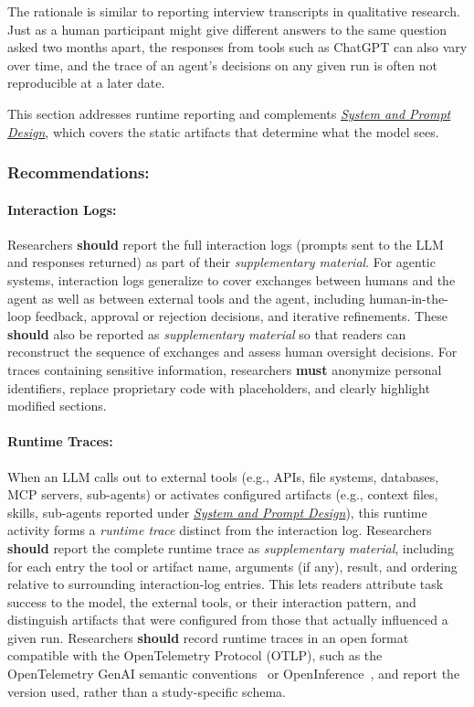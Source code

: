 \documentclass[smallextended]{svjour3}
\newcommand{\must}{\textbf{must}\xspace}
\newcommand{\should}{\textbf{should}\xspace}
\newcommand{\supplementarymaterial}{\emph{supplementary material}\xspace}
\newcommand{\supplementarymaterial}{\emph{supplementary material}\xspace}
\newcommand{\design}{\hyperref[sec:report-system-and-prompt-design]{\emph{System and Prompt Design}}\xspace}
\newcommand{\design}{\href{/guidelines\#report-system-and-prompt-design}{\emph{System and Prompt Design}}\xspace}
\newcommand{\guidelinesubsubsection}[1]{\subsubsection{\bfseries #1:}}
\newcommand{\guidelinesubsubsection}[1]{\subsubsection{#1}}
\begin{document}
The rationale is similar to reporting interview transcripts in qualitative research.
Just as a human participant might give different answers to the same question asked two months apart, the responses from tools such as ChatGPT can also vary over time, and the trace of an agent's decisions on any given run is often not reproducible at a later date.

This section addresses runtime reporting and complements \design, which covers the static artifacts that determine what the model sees.

\guidelinesubsubsection{Recommendations}

\paragraph{Interaction Logs:}
Researchers \should report the full interaction logs (prompts sent to the LLM and responses returned) as part of their \supplementarymaterial.
For agentic systems, interaction logs generalize to cover exchanges between humans and the agent as well as between external tools and the agent, including human-in-the-loop feedback, approval or rejection decisions, and iterative refinements.
These \should also be reported as \supplementarymaterial so that readers can reconstruct the sequence of exchanges and assess human oversight decisions.
For traces containing sensitive information, researchers \must anonymize personal identifiers, replace proprietary code with placeholders, and clearly highlight modified sections.

\paragraph{Runtime Traces:}
When an LLM calls out to external tools (e.g., APIs, file systems, databases, MCP servers, sub-agents) or activates configured artifacts (e.g., context files, skills, sub-agents reported under \design), this runtime activity forms a \emph{runtime trace} distinct from the interaction log.
Researchers \should report the complete runtime trace as \supplementarymaterial, including for each entry the tool or artifact name, arguments (if any), result, and ordering relative to surrounding interaction-log entries.
This lets readers attribute task success to the model, the external tools, or their interaction pattern, and distinguish artifacts that were configured from those that actually influenced a given run.
Researchers \should record runtime traces in an open format compatible with the OpenTelemetry Protocol (OTLP), such as the OpenTelemetry GenAI semantic conventions~\cite{otel_genai_semconv} or OpenInference~\cite{openinference_spec}, and report the version used, rather than a study-specific schema.
\end{document}

